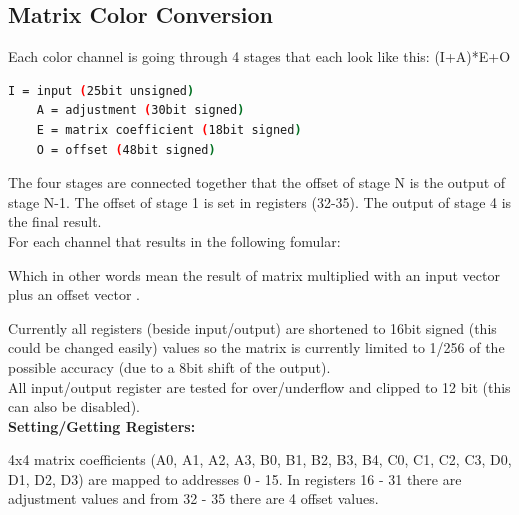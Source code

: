 \subsection{Matrix Color Conversion} %

Each color channel is going through 4 stages that each look like this: (I+A)*E+O 

\begin{lstlisting}[language=bash,morekeywords=$,keywordstyle=\bfseries,frame=none,xleftmargin=.25in,belowskip=2em, aboveskip=2em]
    I = input (25bit unsigned)
    A = adjustment (30bit signed)
    E = matrix coefficient (18bit signed)
    O = offset (48bit signed)
\end{lstlisting}

The four stages are connected together that the offset of stage N is the output of stage N-1. The offset of stage 1 is set in registers (32-35). The output of stage 4 is the final result.\\


For each channel that results in the following fomular: 


Which in other words mean the result of matrix  multiplied with an input vector  plus an offset vector .

Currently all registers (beside input/output) are shortened to 16bit signed (this could be changed easily) values so the matrix is currently limited to 1/256 of the possible accuracy (due to a 8bit shift of the output).\\

All input/output register are tested for over/underflow and clipped to 12 bit (this can also be disabled).\\ 

\textbf{Setting/Getting Registers: }\\


    
4x4 matrix coefficients (A0, A1, A2, A3, B0, B1, B2, B3, B4, C0, C1, C2, C3, D0, D1, D2, D3) are mapped to addresses 0 - 15. In registers 16 - 31 there are adjustment values and from 32 - 35 there are 4 offset values.\\

